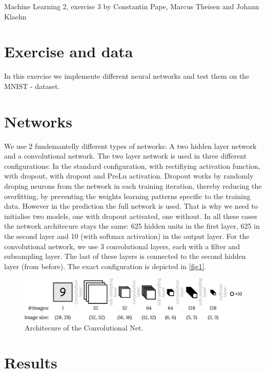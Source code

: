 \documentclass{article}
\begin{document}
Machine Learning 2, exercise 3 by Constantin Pape, Marcus Theisen and Johann Klaehn
 
\section{Exercise and data}

In this exercise we implemente different neural networks and test them on the MNIST - dataset.

\section{Networks}

We use 2 fundemantelly different types of networks:
A two hidden layer network and a convolutional network.
The two layer network is used in three different configurations:
\newline 
In the standard configuration, with rectifiying activation function, with dropout, with dropout and PreLu activation.
\newline
Dropout works by randomly droping neurons from the network in each training iteration, thereby
reducing the overfitting, by preventing the weights learning patterns specific to the training data. However in the prediction the full network is used. That is why we need to initialise two models, one with dropout activated, one without.
\newline
In all these cases the network architecure stays the same:
625 hidden units in the first layer, 625 in the second layer and 10 (with softmax activation)
in the output layer.
\newline
For the convolutional network, we use 3 convolutional layers, each with a filter and subsampling layer. The last of these layers is connected to the second hidden layer (from before). The exact configuration is depicted in \autoref{fig1}.

\begin{figure}[h]
	\centering
	\includegraphics[width = .8\textwidth]{graphics/sketch.pdf}
	\caption{Architecure of the Convolutional Net.}
	\label{fig1}
\end{figure}

\section{Results}
\end{document}
